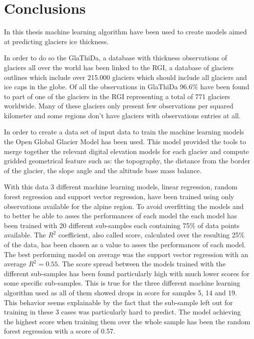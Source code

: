 \chapter{Conclusions}\label{concl}
\thispagestyle{plain}

In this thesis machine learning algorithm have been used to create models aimed at predicting glaciers ice thickness.

In order to do so the GlaThiDa, a database with thickness observations of glaciers all over the world has been linked to the RGI, a database of glaciers outlines which include over 215.000 glaciers which should include all glaciers and ice caps in the globe. Of all the observations in GlaThiDa 96.6\% have been found to part of one of the glaciers in the RGI representing a total of 771 glaciers worldwide. Many of these glaciers only present few observations per squared kilometer and some regions don't have glaciers with observations entries at all.

In order to create a data set of input data to train the machine learning models the Open Global Glacier Model has been used. This model provided the tools to merge together the relevant digital elevation models for each glacier and compute gridded geometrical feature such as: the topography, the distance from the border of the glacier, the slope angle and the altitude base mass balance.

With this data 3 different machine learning models, linear regression, random forest regression and support vector regression, have been trained using only observations available for the alpine region. To avoid overfitting the models and to better be able to asses the performances of each model the each model has been trained with 20 different sub-samples each containing 75\% of data points available. The $R^2$ coefficient, also called score, calculated over the resulting 25\% of the data, has been chosen as a value to asses the performances of each model. The best performing model on average was the support vector regression with an average $R^2 = 0.55$. The score spread between the models trained with the different sub-samples has been found particularly high with much lower scores for some specific sub-samples. This is true for the three different machine learning algorithm used as all of them showed drops in score for samples 5, 14 and 19. This behavior seems explainable by the fact that the sub-sample left out for training in these 3 cases was particularly hard to predict.
The model achieving the highest score when training them over the whole sample has been the random forest regression with a score of 0.57.

